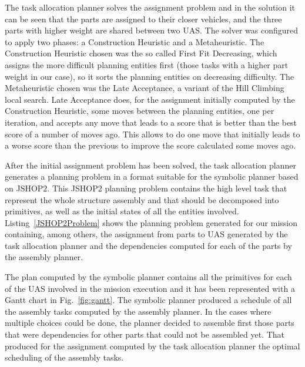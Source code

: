 \documentclass[letterpaper, 12pt, conference]{ieeeconf}    %
\begin{document}
%
%

The task allocation planner solves the assignment problem and in the solution it can be seen that the parts are assigned to their closer vehicles, and the three parts with higher weight are shared between two UAS. The solver was configured to apply two phases: a Construction Heuristic and a Metaheuristic. The Construction Heuristic chosen was the so called First Fit Decreasing, which assigns the more difficult planning entities first (those tasks with a higher part weight in our case), so it sorts the planning entities on decreasing difficulty. The Metaheuristic chosen was the Late Acceptance, a variant of the Hill Climbing local search. Late Acceptance does, for the assignment initially computed by the Construction Heuristic, some moves between the planning entities, one per iteration, and accepts any move that leads to a score that is better than the best score of a number of moves ago. This allows to do one move that initially leads to a worse score than the previous to improve the score calculated some moves ago. 

After the initial assignment problem has been solved, the task allocation planner generates a planning problem in a format suitable for the symbolic planner based on JSHOP2. This JSHOP2 planning problem contains the high level task that represent the whole structure assembly and that should be decomposed into primitives, as well as the initial states of all the entities involved. Listing~\ref{JSHOP2Problem} shows the planning problem generated for our mission containing, among others, the assignment from parts to UAS generated by the task allocation planner and the dependencies computed for each of the parts by the assembly planner. 



The plan computed by the symbolic planner contains all the primitives for each of the UAS involved in the mission execution and it has been represented with a Gantt chart in Fig.~\ref{fig:gantt}. The symbolic planner produced a schedule of all the assembly tasks computed by the assembly planner. In the cases where multiple choices could be done, the planner decided to assemble first those parts that were dependencies for other parts that could not be assembled yet. That produced for the assignment computed by the task allocation planner the optimal scheduling of the assembly tasks.
\end{document}
